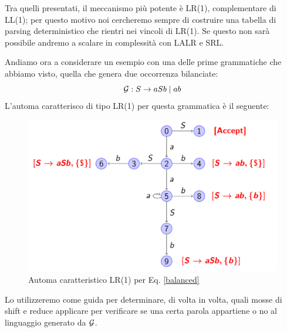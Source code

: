 \documentclass[class=book, crop=false, oneside, 12pt]{standalone}
\begin{document}
Tra quelli presentati, il meccanismo più potente è LR(1), complementare di LL(1); per questo motivo noi cercheremo sempre di costruire una tabella di parsing deterministico che rientri nei vincoli di LR(1). Se questo non sarà possibile andremo a scalare in complessità con LALR e SRL.

Andiamo ora a considerare un esempio con una delle prime grammatiche che abbiamo visto, quella che genera due occorrenza bilanciate:
\begin{equation*}
    \label{balanced}
    \mathcal{G}: S \to aSb \mid ab
\end{equation*}
L'automa caratterisco di tipo LR(1) per questa grammatica è il seguente:
\begin{figure}[H]
    \centering
    \includegraphics[width=\textwidth,keepaspectratio]{balanced-char_aut-lr1.png}
    \caption{Automa caratteristico LR(1) per Eq. \ref{balanced}}
    \label{balanced-char_aut-lr1}
\end{figure}
Lo utilizzeremo come guida per determinare, di volta in volta, quali mosse di shift e reduce applicare per verificare se una certa parola appartiene o no al linguaggio generato da \(\mathcal{G}\).
\end{document}
